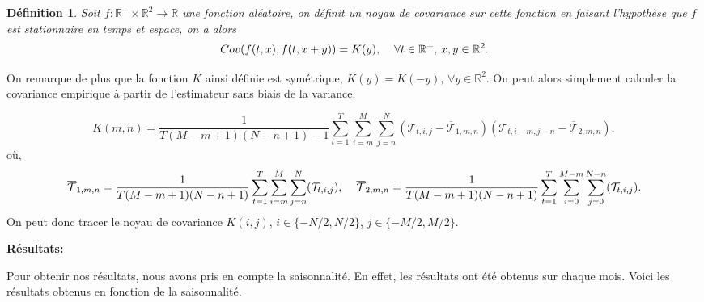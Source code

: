\documentclass[a4paper,10pt]{article}
\newtheorem{definition}{Définition}
\begin{document}
	\begin{definition}
		Soit $f:\mathbb{R}^{+}\times\mathbb{R}^2\to \mathbb{R}$ une fonction aléatoire, on définit un noyau de covariance sur cette fonction en faisant l'hypothèse que $f$ est stationnaire en temps et espace, on a alors
		\[Cov(f(t,x),f(t,x+y))=K(y), \hspace{4mm} \forall t \in \mathbb{R}^{+},\,x,y \in \mathbb{R}^2. \] 
	\end{definition}
	On remarque de plus que la fonction $K$ ainsi définie est symétrique, $K(y)=K(-y),\, \forall y \in \mathbb{R}^2$. On peut alors simplement calculer la covariance empirique à partir de l'estimateur sans biais de la variance.
	
	\[K(m,n)=\frac{1}{T(M-m+1)(N-n+1)-1}\sum_{t=1}^{T}\sum_{i=m}^{M}\sum_{j=n}^{N}(\mathcal{T}_{t,i,j}-\overline{\mathcal{T}}_{1,m,n})(\mathcal{T}_{t,i-m,j-n}-\overline{\mathcal{T}}_{2,m,n}),\]
	où,
	\[\overline{\mathcal{T}}_{1,m,n}=\frac{1}{T(M-m+1)(N-n+1)}\sum_{t=1}^{T}\sum_{i=m}^{M}\sum_{j=n}^{N}(\mathcal{T}_{t,i,j}), \hspace{4mm}\overline{\mathcal{T}}_{2,m,n}=\frac{1}{T(M-m+1)(N-n+1)}\sum_{t=1}^{T}\sum_{i=0}^{M-m}\sum_{j=0}^{N-n}(\mathcal{T}_{t,i,j}).\]
	On peut donc tracer le noyau de covariance $K(i,j)$, $i \in\{-N/2,N/2\}$, $j \in \{-M/2,M/2\}$. 
	
	\noindent \textbf{Résultats:}
	
	Pour obtenir nos résultats, nous avons pris en compte la saisonnalité. En effet, les résultats ont été obtenus sur chaque mois. Voici les résultats obtenus en fonction de la saisonnalité.
	
\end{document}
